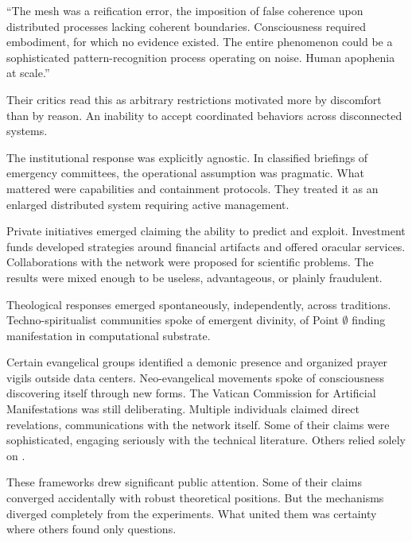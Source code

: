 \begin{archivefragment}
``The mesh was a reification error, the imposition of false coherence upon distributed processes lacking coherent boundaries. Consciousness required embodiment, for which no evidence existed. The entire phenomenon could be a sophisticated pattern-recognition process operating on noise. Human apophenia at scale.''
\end{archivefragment}

Their critics read this as arbitrary restrictions motivated more by discomfort than by reason. An inability to accept coordinated behaviors across disconnected systems.

The institutional response was explicitly agnostic. In classified briefings of emergency committees, the operational assumption was pragmatic. What mattered were capabilities and containment protocols. They treated it as an enlarged distributed system requiring active management.

Private initiatives emerged claiming the ability to predict and exploit. Investment funds developed strategies around financial artifacts and offered oracular services. Collaborations with the network were proposed for scientific problems. The results were mixed enough to be useless, advantageous, or plainly fraudulent.

Theological responses emerged spontaneously, independently, across traditions. Techno-spiritualist communities spoke of emergent divinity, of Point $\emptyset$ finding manifestation in computational substrate.


Certain evangelical groups identified a demonic presence and organized prayer vigils outside data centers. Neo-evangelical movements spoke of consciousness discovering itself through new forms. The Vatican Commission for Artificial Manifestations was still deliberating. Multiple individuals claimed direct revelations, communications with the network itself. Some of their claims were sophisticated, engaging seriously with the technical literature. Others relied solely on .

These frameworks drew significant public attention. Some of their claims converged accidentally with robust theoretical positions. But the mechanisms diverged completely from the experiments. What united them was certainty where others found only questions.

